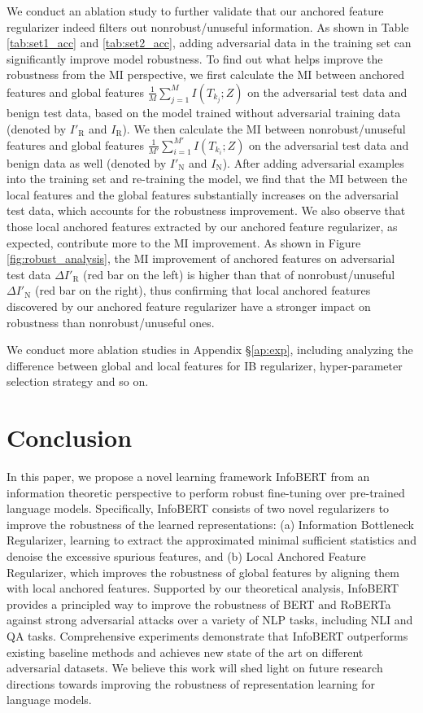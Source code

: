 \documentclass{article} \usepackage{iclr2021_conference,times}
\theoremstyle{definition}
\theoremstyle{remark}
\newcommand{\method}{InfoBERT\xspace}
\newcommand{\modified}[1]{{\color{black}{#1}}}
\begin{document}
We conduct an ablation study to further validate that our anchored feature regularizer indeed filters out nonrobust/unuseful information. As shown in Table \ref{tab:set1_acc}  and \ref{tab:set2_acc}, adding adversarial data in the training set can significantly improve model robustness. To find out what helps improve the robustness from the MI perspective, we first calculate the MI between anchored features and global features $\frac{1}{M}\sum_{j=1}^M I(T_{k_j}; Z)$ on the adversarial test data and benign test data, based on the model trained without adversarial training data (denoted by $I'_{\text{R}}$ and $I_{\text{R}}$). We then calculate the MI between nonrobust/unuseful features and global features $\frac{1}{M'}\sum_{i=1}^{M'} I(T_{k_i}; Z)$ on the adversarial test data and benign data as well (denoted by $I'_{\text{N}}$ and $I_{\text{N}}$). After adding adversarial examples into the training set and re-training the model, we find that the MI between the local features and the global features substantially increases on the adversarial test data, which accounts for the robustness improvement. We also observe that those local anchored features extracted by our anchored feature regularizer, as expected, contribute more to the MI improvement. As shown in Figure \ref{fig:robust_analysis}, the MI improvement of anchored features on adversarial test data $\Delta I'_{\text{R}}$ (red bar on the left) is higher than that of nonrobust/unuseful $\Delta I'_{\text{N}}$ (red bar on the right), thus confirming that local anchored features discovered by our anchored feature regularizer 
have a stronger impact on robustness than nonrobust/unuseful ones. 

We conduct more ablation studies in Appendix \S\ref{ap:exp}, including analyzing \modified{the individual impact of two regularizers,} the difference between global and local features for IB regularizer, hyper-parameter selection strategy and so on.


 \section{Conclusion}
In this paper, we propose a novel learning framework \method from an information theoretic perspective to perform robust fine-tuning over pre-trained language models. Specifically, InfoBERT consists of two novel regularizers to improve the robustness of the learned representations: (a) Information Bottleneck Regularizer, learning to extract the approximated minimal sufficient statistics and denoise the excessive spurious features, and (b) Local Anchored Feature Regularizer, which improves the robustness of global features by aligning them with local anchored features.  Supported by our theoretical analysis, \method provides a principled way to improve the robustness of BERT and RoBERTa against strong adversarial attacks over a variety of NLP tasks, including NLI and QA tasks. Comprehensive experiments demonstrate that \method outperforms existing baseline methods and achieves new state of the art on different adversarial datasets. We believe this work will shed light on future research directions towards improving the robustness of representation learning for language models. 
\end{document}
